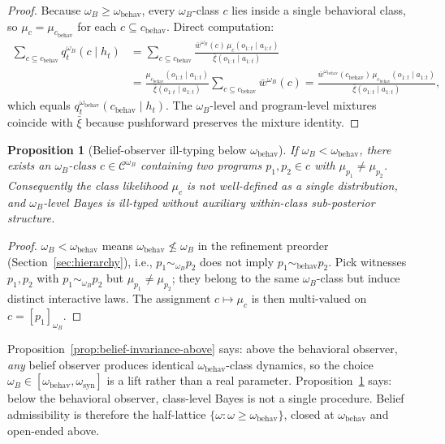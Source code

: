 \documentclass[11pt]{article}
\newtheorem{proposition}[theorem]{Proposition}
\theoremstyle{definition}
\theoremstyle{remark}
\newcommand{\Ccal}{\mathcal{C}}
\newcommand{\barxi}{\bar{\xi}}
\begin{document}
\begin{proof}
Because $\omega_B\ge\omega_{\mathrm{behav}}$, every $\omega_B$-class $c$ lies inside a single behavioral class, so $\mu_c=\mu_{c_{\mathrm{behav}}}$ for each $c\subseteq c_{\mathrm{behav}}$. Direct computation:
\begin{align*}
\sum_{c\subseteq c_{\mathrm{behav}}}q_t^{\omega_B}(c\mid h_t)
&=\sum_{c\subseteq c_{\mathrm{behav}}}\frac{\bar w^{\omega_B}(c)\,\mu_c(o_{1:t}\mid a_{1:t})}{\barxi(o_{1:t}\mid a_{1:t})}\\
&=\frac{\mu_{c_{\mathrm{behav}}}(o_{1:t}\mid a_{1:t})}{\barxi(o_{1:t}\mid a_{1:t})}\sum_{c\subseteq c_{\mathrm{behav}}}\bar w^{\omega_B}(c)
=\frac{\bar w^{\omega_{\mathrm{behav}}}(c_{\mathrm{behav}})\,\mu_{c_{\mathrm{behav}}}(o_{1:t}\mid a_{1:t})}{\barxi(o_{1:t}\mid a_{1:t})},
\end{align*}
which equals $q_t^{\omega_{\mathrm{behav}}}(c_{\mathrm{behav}}\mid h_t)$. The $\omega_B$-level and program-level mixtures coincide with $\barxi$ because pushforward preserves the mixture identity.
\end{proof}

\begin{proposition}[Belief-observer ill-typing below $\omega_{\mathrm{behav}}$]
\label{prop:belief-illtyped-below}
If $\omega_B<\omega_{\mathrm{behav}}$, there exists an $\omega_B$-class $c\in\Ccal^{\omega_B}$ containing two programs $p_1,p_2\in c$ with $\mu_{p_1}\neq\mu_{p_2}$. Consequently the class likelihood $\mu_c$ is not well-defined as a single distribution, and $\omega_B$-level Bayes is ill-typed without auxiliary within-class sub-posterior structure.
\end{proposition}

\begin{proof}
$\omega_B<\omega_{\mathrm{behav}}$ means $\omega_{\mathrm{behav}}\not\le\omega_B$ in the refinement preorder (Section~\ref{sec:hierarchy}), i.e., $p_1\sim_{\omega_B}p_2$ does not imply $p_1\sim_{\mathrm{behav}}p_2$. Pick witnesses $p_1,p_2$ with $p_1\sim_{\omega_B}p_2$ but $\mu_{p_1}\neq\mu_{p_2}$; they belong to the same $\omega_B$-class but induce distinct interactive laws. The assignment $c\mapsto\mu_c$ is then multi-valued on $c=[p_1]_{\omega_B}$.
\end{proof}

Proposition~\ref{prop:belief-invariance-above} says: above the behavioral observer, \emph{any} belief observer produces identical $\omega_{\mathrm{behav}}$-class dynamics, so the choice $\omega_B\in[\omega_{\mathrm{behav}},\omega_{\mathrm{syn}}]$ is a lift rather than a real parameter. Proposition~\ref{prop:belief-illtyped-below} says: below the behavioral observer, class-level Bayes is not a single procedure. Belief admissibility is therefore the half-lattice $\{\omega:\omega\ge\omega_{\mathrm{behav}}\}$, closed at $\omega_{\mathrm{behav}}$ and open-ended above.
\end{document}
